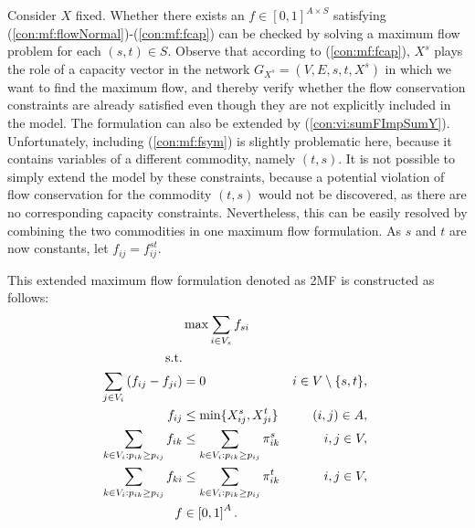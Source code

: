 Consider $X$ fixed.
Whether there exists an $f\in\left[0,1\right]^{A\times S}$ satisfying (\ref{con:mf:flowNormal})-(\ref{con:mf:fcap}) can be checked by solving a maximum flow problem for each $(s,t)\in S$.
Observe that according to (\ref{con:mf:fcap}), $X^s$ plays the role of a capacity vector in the network $G_{X^s}=(V,E,s,t,X^s)$ in which we want to find the maximum flow, and thereby verify whether the flow conservation constraints are already satisfied even though they are not explicitly included in the model.
The formulation can also be extended by (\ref{con:vi:sumFImpSumY}).
Unfortunately, including (\ref{con:mf:fsym}) is slightly problematic here, because it contains variables of a different commodity, namely $(t,s)$.
It is not possible to simply extend the model by these constraints, because a potential violation of flow conservation for the commodity $(t,s)$ would not be discovered, as there are no corresponding capacity constraints.
Nevertheless, this can be easily resolved by combining the two commodities in one maximum flow formulation.
As $s$ and $t$ are now constants, let $f_{ij}=f^{st}_{ij}$.

This extended maximum flow formulation denoted as 2MF is constructed as follows:
\newline
\newline  
\begin{subequations}\label{eq:mf}
\begin{align}
\label{objective:maxf} &\max\sum\limits_{i \in V_s} f_{si} \\ 
\text{s.t.}  \notag   \\
\label{con:maxf:flowNormal}  \sum\limits_{\substack{ j\in V_i}}\left(f_{ij}-f_{ji}\right) & = 0 & i\in V\setminus\{s,t\},\\
\label{con:maxf:fcapst}   f_{ij} &\leq \min\{X_{ij}^s, X_{ji}^t\}     &  (i,j)\in A,  \\ 	 
\label{con:maxf:sumFImpSumYst} \sum\limits_{k\in V_i:p_{ik}\geq p_{ij}}f_{ik} & \leq \sum\limits_{k\in V_i:p_{ik}\geq p_{ij}}  \pi^{s}_{ik} & i,j\in V,\\
\label{con:maxf:sumFImpSumYts} \sum\limits_{k\in V_i:p_{ik}\geq p_{ij}}f_{ki} & \leq \sum\limits_{k\in V_i:p_{ik}\geq p_{ij}}  \pi^{t}_{ik} &  i,j\in V,\\
\label{con:maxf:fdim}f&\in\left[0,1\right]^{A}. 
\end{align}~
\end{subequations}  
  
